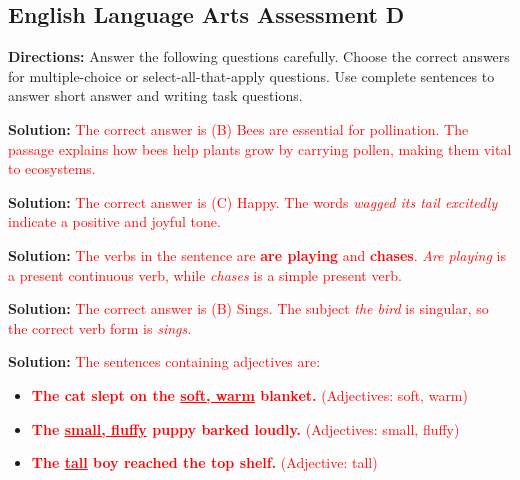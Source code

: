 \documentclass[12pt]{article}
\begin{document}
\subsection*{English Language Arts Assessment D}
\onehalfspacing

\begin{tcolorbox}[colframe=black!50, colback=white, title=Assessment Directions]
\textbf{Directions:} Answer the following questions carefully. Choose the correct answers for multiple-choice or select-all-that-apply questions. Use complete sentences to answer short answer and writing task questions.
\end{tcolorbox}

\begin{tcolorbox}[colframe=black!50, colback=white, title=Question 1]
\textbf{Solution:} \textcolor{red}{The correct answer is (B) Bees are essential for pollination. The passage explains how bees help plants grow by carrying pollen, making them vital to ecosystems.}
\end{tcolorbox}

\begin{tcolorbox}[colframe=black!50, colback=white, title=Question 2]
\textbf{Solution:} \textcolor{red}{The correct answer is (C) Happy. The words \textit{wagged its tail excitedly} indicate a positive and joyful tone.}
\end{tcolorbox}

\begin{tcolorbox}[colframe=black!50, colback=white, title=Question 3]
\textbf{Solution:} \textcolor{red}{The verbs in the sentence are \textbf{are playing} and \textbf{chases}. \textit{Are playing} is a present continuous verb, while \textit{chases} is a simple present verb.}
\end{tcolorbox}

\begin{tcolorbox}[colframe=black!50, colback=white, title=Question 4]
\textbf{Solution:} \textcolor{red}{The correct answer is (B) Sings. The subject \textit{the bird} is singular, so the correct verb form is \textit{sings}.}
\end{tcolorbox}

\begin{tcolorbox}[colframe=black!50, colback=white, title=Question 5]
\textbf{Solution:} \textcolor{red}{The sentences containing adjectives are:}
\begin{itemize}
\item \textcolor{red}{\textbf{The cat slept on the \underline{soft, warm} blanket.} (Adjectives: soft, warm)}
\item \textcolor{red}{\textbf{The \underline{small, fluffy} puppy barked loudly.} (Adjectives: small, fluffy)}
\item \textcolor{red}{\textbf{The \underline{tall} boy reached the top shelf.} (Adjective: tall)}
\end{itemize}
\end{tcolorbox}
\end{document}
